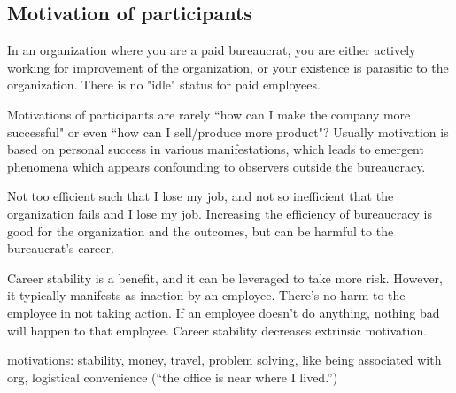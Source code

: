 \subsection{Motivation of participants}


In an organization where you are a paid bureaucrat, you are either actively working for improvement of the organization, or your existence is parasitic to the organization. There is no "idle" status for paid employees.

Motivations of participants are rarely ``how can I make the company more successful" or even ``how can I sell/produce more product"? Usually motivation is based on personal success in various manifestations, which leads to emergent phenomena which appears confounding to observers outside the bureaucracy. 

Not too efficient such that I lose my job, and not so inefficient that the organization fails and I lose my job. Increasing the efficiency of bureaucracy is good for the organization and the outcomes, but can be harmful to the bureaucrat's career.

Career stability is a benefit, and it can be leveraged to take more risk. However, it typically manifests as inaction by an employee. There's no harm to the employee in not taking action. If an employee doesn't do anything, nothing bad will happen to that employee. Career stability decreases extrinsic motivation.



motivations: stability, money, travel, problem solving, like being associated with org, logistical convenience (``the office is near where I lived.'')